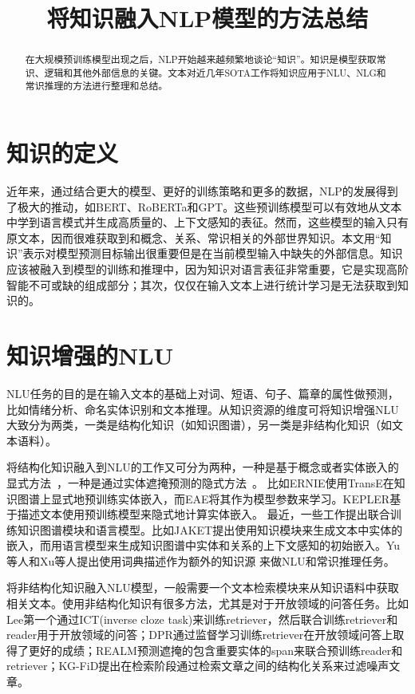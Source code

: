 \documentclass[11pt]{article}
\begin{document}
\title{将知识融入NLP模型的方法总结}
\maketitle

\begin{abstract}
在大规模预训练模型出现之后，NLP开始越来越频繁地谈论“知识”。知识是模型获取常识、逻辑和其他外部信息的关键。文本对近几年SOTA工作将知识应用于NLU、NLG和常识推理的方法进行整理和总结。
\end{abstract}

\section{知识的定义}
近年来，通过结合更大的模型、更好的训练策略和更多的数据，NLP的发展得到了极大的推动，如BERT、RoBERTa和GPT。这些预训练模型可以有效地从文本中学到语言模式并生成高质量的、上下文感知的表征。然而，这些模型的输入只有原文本，因而很难获取到和概念、关系、常识相关的外部世界知识。本文用“知识”表示对模型预测目标输出很重要但是在当前模型输入中缺失的外部信息。知识应该被融入到模型的训练和推理中，因为知识对语言表征非常重要，它是实现高阶智能不可或缺的组成部分；其次，仅仅在输入文本上进行统计学习是无法获取到知识的。

\section{知识增强的NLU}

NLU任务的目的是在输入文本的基础上对词、短语、句子、篇章的属性做预测，比如情绪分析、命名实体识别和文本推理。从知识资源的维度可将知识增强NLU大致分为两类，一类是结构化知识（如知识图谱），另一类是非结构化知识（如文本语料）。

将结构化知识融入到NLU的工作又可分为两种，一种是基于概念或者实体嵌入的显式方法~\cite{zhang2019ernie,peters2019knowledge,liu2020k,yu2020identifying,zeng2020tri}，一种是通过实体遮掩预测的隐式方法~\cite{sun2019ernie,shen2020exploiting,xiong2020pretrained,wang2021kepler}。
比如ERNIE\cite{zhang2019ernie}使用TransE在知识图谱上显式地预训练实体嵌入，而EAE\cite{fevry2020entities}将其作为模型参数来学习。KEPLER\cite{wang2021kepler}基于描述文本使用预训练模型来隐式地计算实体嵌入。
最近，一些工作提出联合训练知识图谱模块和语言模型。比如JAKET\cite{yu2022jaket}提出使用知识模块来生成文本中实体的嵌入，而用语言模型来生成知识图谱中实体和关系的上下文感知的初始嵌入。Yu等人\cite{yu2022dict}和Xu等人\cite{xu2021fusing}提出使用词典描述作为额外的知识源 来做NLU和常识推理任务。

将非结构化知识融入NLU模型，一般需要一个文本检索模块来从知识语料中获取相关文本。使用非结构化知识有很多方法，尤其是对于开放领域的问答任务。比如Lee第一个通过ICT(inverse cloze task)来训练retriever，然后联合训练retriever和reader用于开放领域的问答；DPR通过监督学习训练retriever在开放领域问答上取得了更好的成绩；REALM预测遮掩的包含重要实体的span来联合预训练reader和retriever；KG-FiD提出在检索阶段通过检索文章之间的结构化关系来过滤噪声文章。
\end{document}
